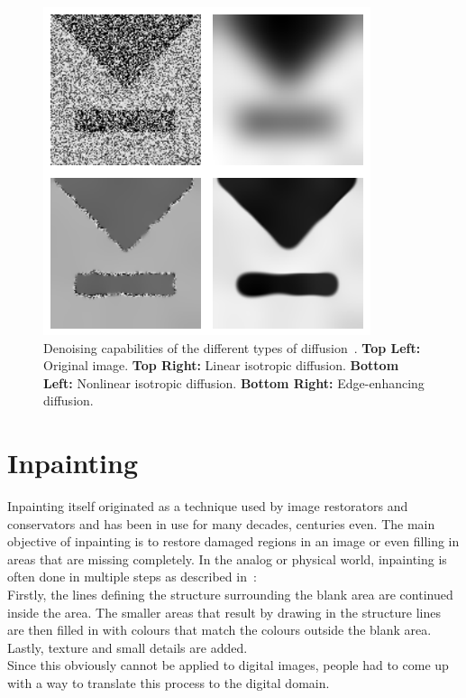 \begin{figure}[H]
    \centering
    \includegraphics[width=0.8\linewidth]{../Images/diff_examples.png}
    \caption{Denoising capabilities of the different types of diffusion~\cite{weickert96}. \textbf{Top Left:} Original
        image. \textbf{Top Right:} Linear isotropic diffusion. \textbf{Bottom Left:} Nonlinear
    isotropic diffusion. \textbf{Bottom Right:} Edge-enhancing diffusion.}\label{fig:DiffExamples}
\end{figure}

\section{Inpainting}\label{sec:Inpainting}
Inpainting itself originated as a technique used by image restorators and conservators and has
been in use for many decades, centuries even. The main objective of inpainting is
to restore damaged regions in an image or even filling in areas that are missing
completely. In the analog or physical world, inpainting is often done in multiple steps as
described in~\cite{bertalmio00}:\\
Firstly, the lines defining the structure surrounding the blank area are continued inside the area.
The smaller areas that result by drawing in the structure lines are then filled in with colours that
match the colours outside the blank area.
Lastly, texture and small details are added.\\
Since this obviously cannot be applied to digital images, people had to come up with a way to
translate this process to the digital domain.

